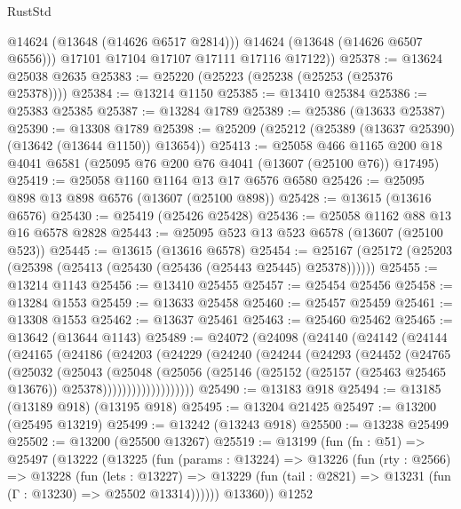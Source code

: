 \begin{lexlean}{RustStd}
\begin{coremodule}
            @14624
            (@13648 (@14626 @6517 @2814)))
          @14624
          (@13648 (@14626 @6507 @6556)))
        @17101
        @17104
        @17107
        @17111
        @17116
        @17122))
@25378 := @13624 @25038 @2635
@25383 := @25220 (@25223 (@25238 (@25253 (@25376 @25378))))
@25384 := @13214 @1150
@25385 := @13410 @25384
@25386 := @25383 @25385
@25387 := @13284 @1789
@25389 := @25386 (@13633 @25387)
@25390 := @13308 @1789
@25398 := @25209 (@25212 (@25389 (@13637 @25390) (@13642 (@13644 @1150)) @13654))
@25413 := @25058
    @466
    @1165
    @200
    @18
    @4041
    @6581
    (@25095 @76 @200 @76 @4041 (@13607 (@25100 @76)) @17495)
@25419 := @25058 @1160 @1164 @13 @17 @6576 @6580
@25426 := @25095 @898 @13 @898 @6576 (@13607 (@25100 @898))
@25428 := @13615 (@13616 @6576)
@25430 := @25419 (@25426 @25428)
@25436 := @25058 @1162 @88 @13 @16 @6578 @2828
@25443 := @25095 @523 @13 @523 @6578 (@13607 (@25100 @523))
@25445 := @13615 (@13616 @6578)
@25454 := @25167 (@25172 (@25203 (@25398 (@25413 (@25430 (@25436 (@25443 @25445) @25378))))))
@25455 := @13214 @1143
@25456 := @13410 @25455
@25457 := @25454 @25456
@25458 := @13284 @1553
@25459 := @13633 @25458
@25460 := @25457 @25459
@25461 := @13308 @1553
@25462 := @13637 @25461
@25463 := @25460 @25462
@25465 := @13642 (@13644 @1143)
@25489 := @24072
    (@24098
      (@24140
        (@24142
          (@24144
            (@24165
              (@24186
                (@24203
                  (@24229
                    (@24240
                      (@24244
                        (@24293
                          (@24452
                            (@24765
                              (@25032
                                (@25043
                                  (@25048
                                    (@25056
                                      (@25146
                                        (@25152
                                          (@25157 (@25463 @25465 @13676))
                                          @25378)))))))))))))))))))
@25490 := @13183 @918
@25494 := @13185 (@13189 @918) (@13195 @918)
@25495 := @13204 @21425
@25497 := @13200 (@25495 @13219)
@25499 := @13242 (@13243 @918)
@25500 := @13238 @25499
@25502 := @13200 (@25500 @13267)
@25519 := @13199
    (fun (fn : @51) =>
    @25497
      (@13222
        (@13225
          (fun (params : @13224) =>
          @13226
            (fun (rty : @2566) =>
            @13228
              (fun (lets : @13227) =>
              @13229 (fun (tail : @2821) => @13231 (fun (Γ : @13230) => @25502 @13314))))))
        @13360))
    @1252

\end{coremodule}
\end{lexlean}
